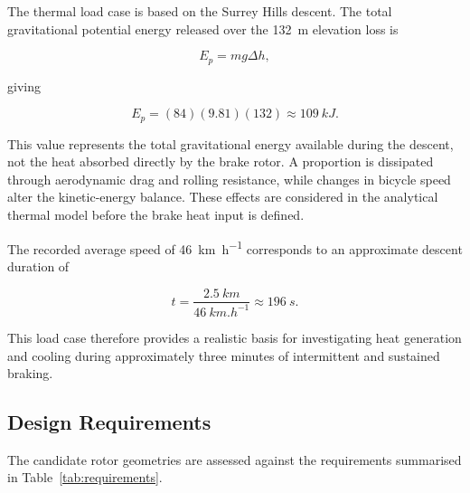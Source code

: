 \documentclass[11pt,a4paper]{article}
\begin{document}
The thermal load case is based on the Surrey Hills descent. The total
gravitational potential energy released over the \SI{132}{m} elevation loss is

\begin{equation}
    E_p = mg\Delta h,
\end{equation}

giving

\begin{equation}
    E_p =
    (84)(9.81)(132)
    \approx
    \SI{109}{kJ}.
\end{equation}

This value represents the total gravitational energy available during the
descent, not the heat absorbed directly by the brake rotor. A proportion is
dissipated through aerodynamic drag and rolling resistance, while changes in
bicycle speed alter the kinetic-energy balance. These effects are considered in
the analytical thermal model before the brake heat input is defined.

The recorded average speed of \SI{46}{km.h^{-1}} corresponds to an approximate
descent duration of

\begin{equation}
    t =
    \frac{\SI{2.5}{km}}
         {\SI{46}{km.h^{-1}}}
    \approx
    \SI{196}{s}.
\end{equation}

This load case therefore provides a realistic basis for investigating heat
generation and cooling during approximately three minutes of intermittent and
sustained braking.


\subsection{Design Requirements}

The candidate rotor geometries are assessed against the requirements summarised
in Table~\ref{tab:requirements}.
\end{document}
